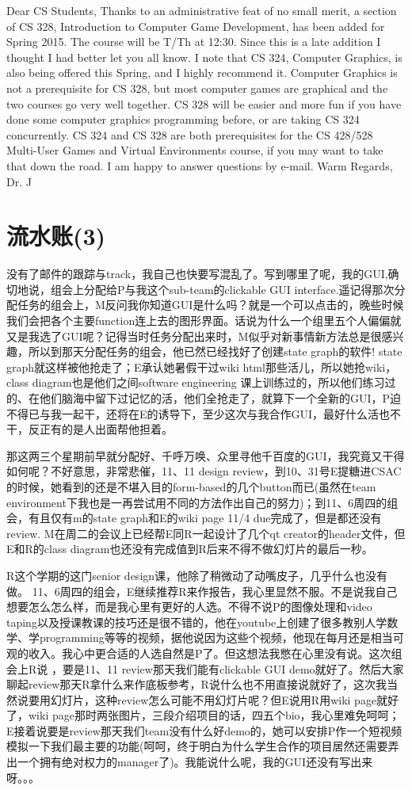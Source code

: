 \documentclass[12pt]{book}
\begin{document}
Dear CS Students,
Thanks to an administrative feat of no small merit, a section of CS 328, Introduction to Computer Game Development, has been added for Spring 2015. The course will be T/Th at 12:30. Since this is a late addition I thought I had better let you all know.
I note that CS 324, Computer Graphics, is also being offered this Spring, and I highly recommend it.  Computer Graphics is not a prerequisite for CS 328, but most computer games are graphical and the two courses go very well together. CS 328 will be easier and more fun if you have done some computer graphics programming before, or are taking CS 324 concurrently. CS 324 and CS 328 are both prerequisites for the CS 428/528 Multi-User Games and Virtual Environments course, if you may want to take that down the road.
I am happy to answer questions by e-mail.
Warm Regards,
Dr. J
\section{流水账(3)}
\label{sec-24-3}
没有了邮件的跟踪与track，我自己也快要写混乱了。写到哪里了呢，我的GUI,确切地说，组会上分配给P与我这个sub-team的clickable GUI interface.遥记得那次分配任务的组会上，M反问我你知道GUI是什么吗？就是一个可以点击的，晚些时候我们会把各个主要function连上去的图形界面。话说为什么一个组里五个人偏偏就又是我选了GUI呢？记得当时任务分配出来时，M似乎对新事情新方法总是很感兴趣，所以到那天分配任务的组会，他已然已经找好了创建state graph的软件! state graph就这样被他抢走了；E承认她暑假干过wiki html那些活儿，所以她抢wiki，class diagram也是他们之间software engineering 课上训练过的，所以他们练习过的、在他们脑海中留下过记忆的活，他们全抢走了，就算下一个全新的GUI，P迫不得已与我一起干，还将在E的诱导下，至少这次与我合作GUI，最好什么活也不干，反正有的是人出面帮他担着。

那这两三个星期前早就分配好、千呼万唤、众里寻他千百度的GUI，我究竟又干得如何呢？不好意思，非常悲催，11、11 design review，到10、31号E提糖进CSAC的时候，她看到的还是不堪入目的form-based的几个button而已(虽然在team environment下我也是一再尝试用不同的方法作出自己的努力)；到11、6周四的组会，有且仅有m的state graph和E的wiki page 11/4 due完成了，但是都还没有review. M在周二的会议上已经帮E同R一起设计了几个qt creator的header文件，但E和R的class diagram也还没有完成值到R后来不得不做幻灯片的最后一秒。

R这个学期的这门senior design课，他除了稍微动了动嘴皮子，几乎什么也没有做。 11、6周四的组会，E继续推荐R来作报告，我心里显然不服。不是说我自己想要怎么怎么样，而是我心里有更好的人选。不得不说P的图像处理和video taping以及授课教课的技巧还是很不错的，他在youtube上创建了很多教别人学数学、学programming等等的视频，据他说因为这些个视频，他现在每月还是相当可观的收入。我心中更合适的人选自然是P了。但这想法我憋在心里没有说。这次组会上R说 ，要是11、11 review那天我们能有clickable GUI demo就好了。然后大家聊起review那天R拿什么来作底板参考，R说什么也不用直接说就好了，这次我当然说要用幻灯片，这种review怎么可能不用幻灯片呢？但E说用R用wiki page就好了，wiki page那时两张图片，三段介绍项目的话，四五个bio，我心里难免呵呵；E接着说要是review那天我们team没有什么好demo的，她可以安排P作一个短视频模拟一下我们最主要的功能(呵呵，终于明白为什么学生合作的项目居然还需要弄出一个拥有绝对权力的manager了)。我能说什么呢，我的GUI还没有写出来呀。。。
\end{document}
